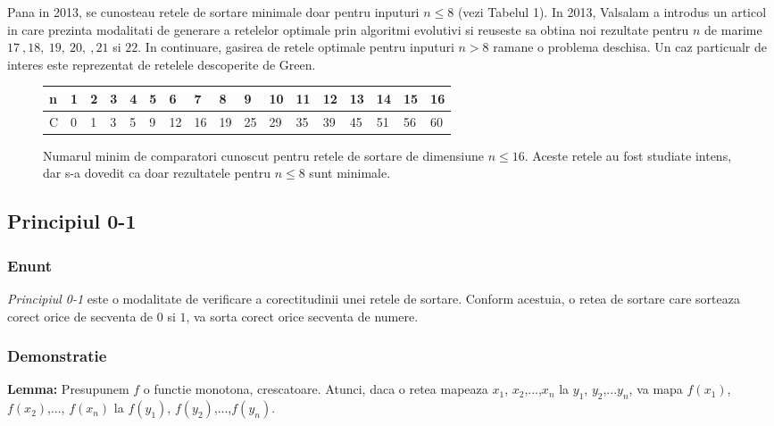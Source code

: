 \documentclass[12pt]{article}
\begin{document}
Pana in 2013, se cunosteau retele de sortare minimale doar pentru inputuri $n \leq 8$ (vezi Tabelul 1). In 2013, Valsalam a introdus un articol in care prezinta modalitati de generare a retelelor optimale prin algoritmi evolutivi si reuseste sa obtina noi rezultate pentru $n$ de marime $17 \ , 18, \  19, \ 20, \ , 21$ si $22$. In continuare, gasirea de retele optimale pentru inputuri $n > 8$ ramane o problema deschisa. Un caz particualr de interes este reprezentat de retelele descoperite de Green.

\begin{figure}
\centering
\begin{tabu} to 1.1 \textwidth {  X[0] | X[1] | X[2] |  X[3] | X[4] | X[5] | X[6] | X[7] | X[8] | X[9] | X[10] | X[11] | X[12] | X[13] | X[14] | X[15] | X[16] }
 \hline
 n & 1 & 2 & 3 & 4 & 5 & 6 & 7 & 8 & 9 & 10 & 11 & 12 & 13 & 14 & 15 & 16\\
 \hline
 C  & 0 & 1 & 3 & 5 & 9 & 12 & 16 & 19 & 25 & 29 & 35 & 39 & 45 & 51 & 56 & 60\\
\hline
\end{tabu}
\caption{Numarul minim de comparatori cunoscut pentru retele de sortare de dimensiune $n \leq 16$. Aceste retele au fost studiate intens, dar s-a dovedit ca doar rezultatele pentru $ n \leq 8$ sunt minimale.}

\end{figure}

\subsection{Principiul 0-1}

\subsubsection{Enunt}
\textit{Principiul 0-1} este o modalitate de verificare a corectitudinii unei retele de sortare. Conform acestuia, o retea de sortare care sorteaza corect orice de secventa de $0$ si $1$, va sorta corect orice secventa de numere.

\subsubsection{Demonstratie}

\textbf{Lemma:} Presupunem $f$ o functie monotona, crescatoare. Atunci, daca o retea mapeaza $x_1$, $x_2$,...,$x_n$ la $y_1$, $y_2$,...$y_n$, va mapa $f(x_1)$, $f(x_2)$,..., $f(x_n)$ la $f(y_1)$, $f(y_2)$,...,$f(y_n)$. 
\end{document}
